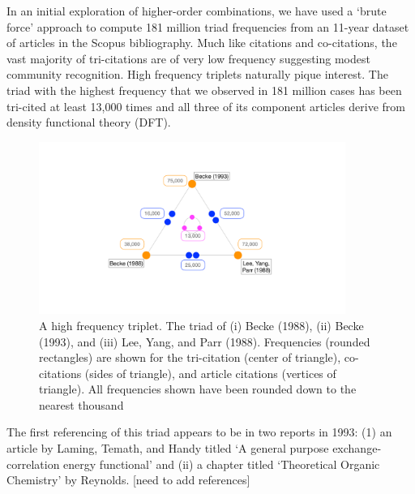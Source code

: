\documentclass[11pt, oneside]{article}   	%
\begin{document}
In an initial exploration of higher-order combinations, we have used a `brute force' approach to compute 181 million triad frequencies from an 11-year dataset of articles in the Scopus bibliography. Much like citations and co-citations, the vast majority of tri-citations are of very low frequency suggesting modest community recognition. High frequency triplets naturally pique interest. The triad with the highest frequency that we observed in 181 million cases has been tri-cited at least 13,000 times and all three of its component articles derive from density functional theory (DFT).

\begin{figure}[h!]
\begin{center}
\includegraphics[width=10cm]{fig1_tricite.pdf}%
\end{center}
\caption{A high frequency triplet. The triad of (i) Becke (1988), (ii) Becke (1993), and (iii) Lee, Yang, and Parr (1988).  Frequencies (rounded rectangles) are shown for the tri-citation (center of triangle), co-citations (sides of triangle), and 
article citations (vertices of triangle). All frequencies shown have been rounded down to the nearest thousand
}
\label{fig:fig1}
\end{figure}

The first referencing of this triad appears to be in two reports in 1993: (1) an article by Laming, Temath, and Handy titled `A general purpose exchange‐correlation energy functional' and (ii) a chapter titled `Theoretical Organic Chemistry' by Reynolds.  [need to add references]
\end{document}
